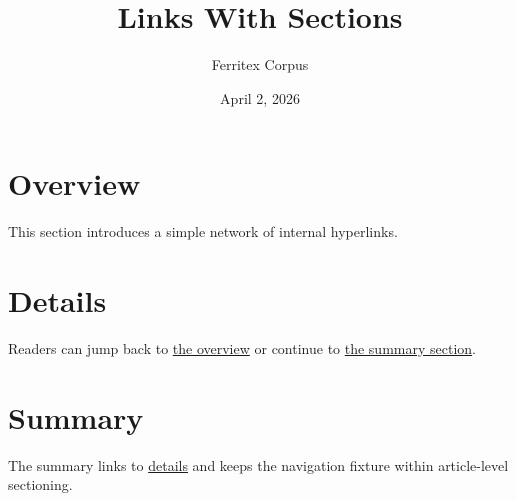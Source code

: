 \documentclass{article}
\title{Links With Sections}
\author{Ferritex Corpus}
\date{April 2, 2026}
\begin{document}
\maketitle

\section{Overview}
\label{sec:overview}
This section introduces a simple network of internal hyperlinks.

\section{Details}
\label{sec:details}
Readers can jump back to \hyperref[sec:overview]{the overview} or continue to
\hyperref[sec:summary]{the summary section}.

\section{Summary}
\label{sec:summary}
The summary links to \hyperref[sec:details]{details} and keeps the navigation
fixture within article-level sectioning.
\end{document}
